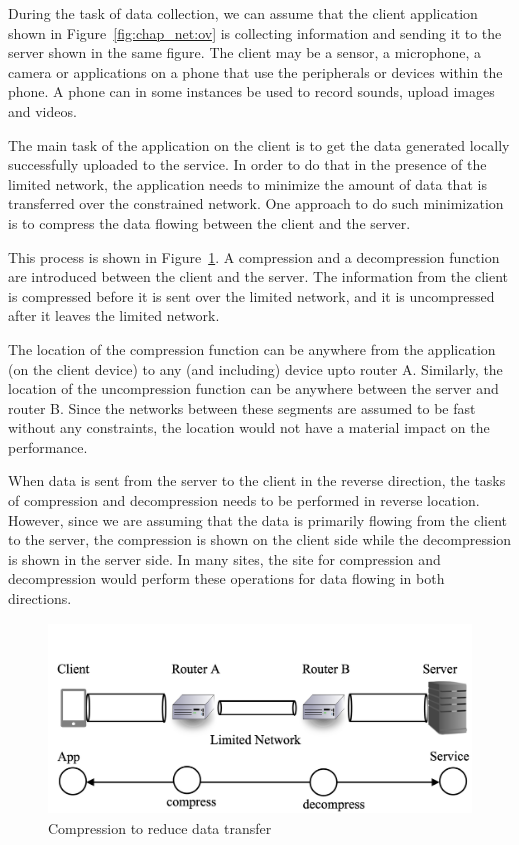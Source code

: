 During the task of data collection, we can assume that the client application shown in Figure~\ref{fig:chap_net:ov} is collecting information and sending it to the server shown in the same figure. The client may be a sensor, a microphone, a camera or applications on a phone that use the peripherals or devices within the phone. A phone can in some instances be used to record sounds, upload images and videos. 

The main task of the application on the client is to get the data generated locally successfully uploaded to the service. In order to do that in the presence of the limited network, the application needs to minimize the amount of data that is transferred over the constrained network. One approach to do such minimization is to compress the data flowing between the client and the server. 

This process is shown in Figure~\ref{fig:chap_net:compress}. A compression and a decompression function are introduced between the client and the server. The information from the client is compressed before it is sent over the limited network, and it is uncompressed after it leaves the limited network. 

The location of the compression function can be anywhere from the application (on the client device) to any (and including) device upto router A. Similarly, the location of the uncompression function can be anywhere between the server and router B. Since the networks between these segments are assumed to be fast without any constraints, the location would not have a material impact on the performance. 

When data is sent from the server to the client in the reverse direction, the tasks of compression and decompression needs to be performed in reverse location. However, since we are assuming that the data is primarily flowing from the client to the server, the compression is shown on the client side while the decompression is shown in the server side. In many sites, the site for compression and decompression would perform these operations for data flowing in both directions. 

\begin{figure}[htbp]
\centering
\includegraphics[height=2in] {chapters/chap_net_limited/chap_net_figures/fig2.png}
\caption{Compression to reduce data transfer}
\label{fig:chap_net:compress}
\end{figure}

